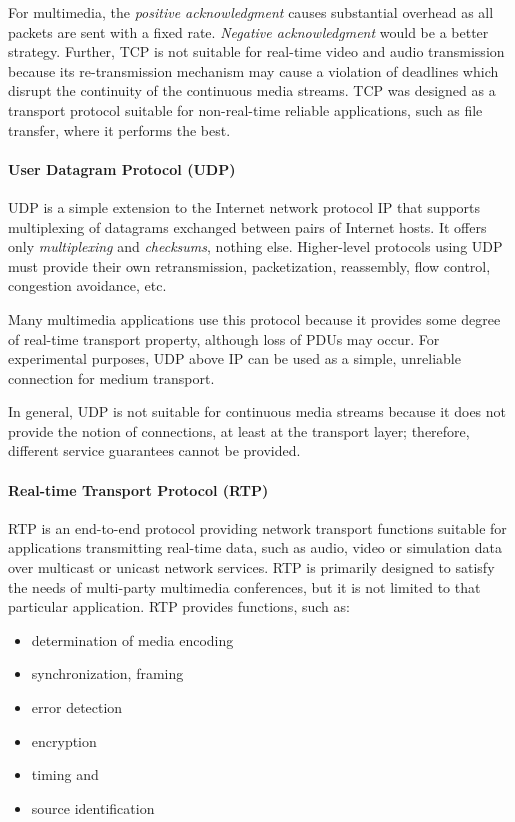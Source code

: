 For multimedia, the \textit{positive acknowledgment} causes substantial overhead as all	packets are sent with a fixed rate. \textit{Negative acknowledgment} would be a better strategy. Further, TCP is not suitable for real-time video and audio transmission because its re-transmission mechanism may cause a violation of deadlines which disrupt the continuity of the continuous media streams. TCP was designed as a transport protocol suitable for non-real-time reliable applications, such as file transfer, where it performs the best.





\paragraph{User Datagram Protocol (UDP)}
UDP is a simple extension to the Internet network protocol IP that supports multiplexing of datagrams exchanged between pairs of Internet hosts. It offers only \textit{multiplexing} and \textit{checksums}, nothing else. Higher-level protocols using UDP must provide their own retransmission, packetization, reassembly, flow control, congestion avoidance, etc.

Many multimedia applications use this protocol because it provides some degree of real-time transport property, although loss of PDUs may occur. For experimental purposes, UDP above IP can be used as a simple, unreliable connection for medium transport.

In general, UDP is not suitable for continuous media streams because it does not provide the notion of connections, at least at the transport layer; therefore, different service guarantees cannot be provided.


\paragraph{Real-time Transport Protocol (RTP)}
RTP is an end-to-end protocol providing network transport functions suitable for applications transmitting real-time data, such as audio, video or simulation data over multicast or unicast network services. RTP is primarily designed to satisfy the needs of multi-party multimedia conferences, but it is not limited to that particular application. RTP provides functions, such as:
\begin{multicols}{2}
	\begin{itemize}
		\item determination of media encoding
		\item synchronization, framing
		\item error detection
		\item encryption
		\item timing and
		\item source identification
	\end{itemize}
\end{multicols}




